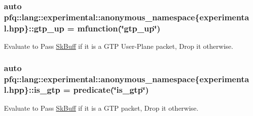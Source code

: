 \hypertarget{namespacepfq_1_1lang_1_1experimental_1_1anonymous__namespace_02experimental_8hpp_03_ac8b95a754c8c3bbef4847904eaf6cb9b}{
\subsubsection[{gtp\+\_\+up}]{\setlength{\rightskip}{0pt plus 5cm}auto pfq\+::lang\+::experimental\+::anonymous\+\_\+namespace\{experimental.\+hpp\}\+::gtp\+\_\+up = {\bf mfunction}(\char`\"{}gtp\+\_\+up\char`\"{})}}\label{namespacepfq_1_1lang_1_1experimental_1_1anonymous__namespace_02experimental_8hpp_03_ac8b95a754c8c3bbef4847904eaf6cb9b}


Evaluate to {\ttfamily Pass} \hyperlink{structpfq_1_1lang_1_1SkBuff}{Sk\+Buff} if it is a G\+T\+P User-\/\+Plane packet, {\ttfamily Drop} it otherwise. 

\hypertarget{namespacepfq_1_1lang_1_1experimental_1_1anonymous__namespace_02experimental_8hpp_03_a2eb9e54a6fc6170b246cf3149445a2c4}{
\subsubsection[{is\+\_\+gtp}]{\setlength{\rightskip}{0pt plus 5cm}auto pfq\+::lang\+::experimental\+::anonymous\+\_\+namespace\{experimental.\+hpp\}\+::is\+\_\+gtp = {\bf predicate}(\char`\"{}is\+\_\+gtp\char`\"{})}}\label{namespacepfq_1_1lang_1_1experimental_1_1anonymous__namespace_02experimental_8hpp_03_a2eb9e54a6fc6170b246cf3149445a2c4}


Evaluate to {\ttfamily Pass} \hyperlink{structpfq_1_1lang_1_1SkBuff}{Sk\+Buff} if it is a G\+T\+P packet, {\ttfamily Drop} it otherwise. 

